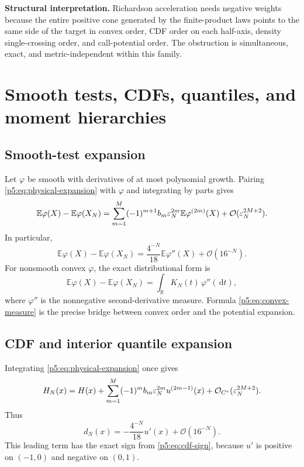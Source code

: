 \documentclass[11pt,oneside]{article}
\numberwithin{equation}{section}
\theoremstyle{definition}
\theoremstyle{remark}
\newcommand{\R}{\mathbb R}
\newcommand{\E}{\mathbb E}
\newcommand{\dd}{\,\mathrm d}
\newcommand{\bigO}{\mathcal O}
\begin{document}
\begin{boxedremark}
\textbf{Structural interpretation.}  Richardson acceleration needs negative weights because the entire positive cone generated by the finite-product laws points to the same side of the target in convex order, CDF order on each half-axis, density single-crossing order, and call-potential order.  The obstruction is simultaneous, exact, and metric-independent within this family.
\end{boxedremark}

\section{Smooth tests, CDFs, quantiles, and moment hierarchies}
\label{p5:sec:smooth}

\subsection{Smooth-test expansion}

Let $\varphi$ be smooth with derivatives of at most polynomial growth.  Pairing \eqref{p5:eq:physical-expansion} with $\varphi$ and integrating by parts gives
\begin{equation}
 \E\varphi(X)-\E\varphi(X_N)
 =\sum_{m=1}^{M}(-1)^{m+1}b_m\eps_N^{2m}
 \E\varphi^{(2m)}(X)
 +\bigO(\eps_N^{2M+2}).
 \label{p5:eq:test-expansion}
\end{equation}
In particular,
\begin{equation}
 \E\varphi(X)-\E\varphi(X_N)
 =\frac{4^{-N}}{18}\E\varphi''(X)+\bigO(16^{-N}).
 \label{p5:eq:test-leading}
\end{equation}
For nonsmooth convex $\varphi$, the exact distributional form is
\begin{equation}
 \E\varphi(X)-\E\varphi(X_N)
 =\int_{\R}K_N(t)\,\varphi''(\dd t),
 \label{p5:eq:convex-measure}
\end{equation}
where $\varphi''$ is the nonnegative second-derivative measure.  Formula \eqref{p5:eq:convex-measure} is the precise bridge between convex order and the potential expansion.

\subsection{CDF and interior quantile expansion}

Integrating \eqref{p5:eq:physical-expansion} once gives
\begin{equation}
 H_N(x)=H(x)+\sum_{m=1}^{M}(-1)^mb_m\eps_N^{2m}u^{(2m-1)}(x)
 +\bigO_{C^r}(\eps_N^{2M+2}).
 \label{p5:eq:cdf-expansion}
\end{equation}
Thus
\begin{equation}
 d_N(x)=-\frac{4^{-N}}{18}u'(x)+\bigO(16^{-N}).
 \label{p5:eq:cdf-leading}
\end{equation}
This leading term has the exact sign from \eqref{p5:eq:cdf-sign}, because $u'$ is positive on $(-1,0)$ and negative on $(0,1)$.
\end{document}
